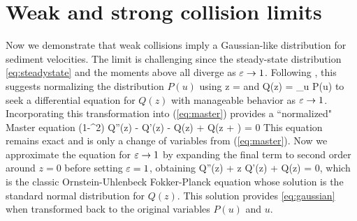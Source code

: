 \section{Weak and strong collision limits}
Now we demonstrate that weak collisions imply a Gaussian-like distribution for sediment velocities. The limit is challenging since the steady-state distribution \ref{eq:steadystate} and the moments above all diverge as $\varepsilon \rightarrow 1$.
Following \cite{Hall1970}, this suggests normalizing the distribution $P(u)$ using 
\be z =  \ee
and 
\be Q(z) = \sigma_u P(u)\ee
to seek a differential equation for $Q(z)$ with manageable behavior as $\varepsilon \rightarrow 1$.
Incorporating this transformation into (\ref{eq:master}) provides a ``normalized" Master equation
\be (1-\ve^2)  Q''(z) - Q'(z) - Q(z) +  Q\Big(z + \Big) = 0 \ee
This equation remains exact and is only a change of variables from (\ref{eq:master}).
Now we approximate the equation for $\varepsilon \rightarrow 1$ by expanding the final term to second order around $z=0$ before setting $\varepsilon = 1$, obtaining
\be Q''(z) + z Q'(z) + Q(z) = 0, \ee
which is the classic Ornstein-Uhlenbeck Fokker-Planck equation whose solution is the standard normal distribution for $Q(z)$. This solution provides \ref{eq:gaussian} when transformed back to the original variables $P(u)$ and $u$.